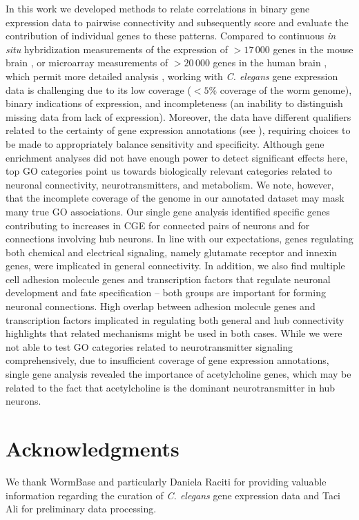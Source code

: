 \documentclass[10pt,letterpaper]{article}
\begin{document}
{In this work we developed methods to relate correlations in binary gene expression data to pairwise connectivity and subsequently score and evaluate the contribution of individual genes to these patterns.
Compared to continuous \emph{in situ} hybridization measurements of the expression of $>17\,000$ genes in the mouse brain \cite{Lein:2007jn}, or microarray measurements of $>20\,000$ genes in the human brain \cite{Hawrylycz:2012ky, Shen:2012ua}, which permit more detailed analysis \cite{Fulcher:2016ck, Ji:2014jw, Fakhry:2015kl, French2011, Vertes2016a, Parkes:2017dn}, working with \emph{C. elegans} gene expression data is challenging due to its low coverage ($<5$\% coverage of the worm genome), binary indications of expression, and incompleteness (an inability to distinguish missing data from lack of expression).
Moreover, the data have different qualifiers related to the certainty of gene expression annotations (see ), requiring choices to be made to appropriately balance sensitivity and specificity.
Although gene enrichment analyses did not have enough power to detect significant effects here, top GO categories point us towards biologically relevant categories related to neuronal connectivity, neurotransmitters, and metabolism.
We note, however, that the incomplete coverage of the genome in our annotated dataset may mask many true GO associations.
Our single gene analysis identified specific genes contributing to increases in CGE for connected pairs of neurons and for connections involving hub neurons.
In line with our expectations, genes regulating both chemical and electrical signaling, namely glutamate receptor and innexin genes, were implicated in general connectivity.
In addition, we also find multiple cell adhesion molecule genes and transcription factors that regulate neuronal development and fate specification -- both groups are important for forming neuronal connections.
High overlap between adhesion molecule genes and transcription factors implicated in regulating both general and hub connectivity highlights that related mechanisms might be used in both cases.
While we were not able to test GO categories related to neurotransmitter signaling comprehensively, due to insufficient coverage of gene expression annotations, single gene analysis revealed the importance of acetylcholine genes, which may be related to the fact that acetylcholine is the dominant neurotransmitter in hub neurons.

\section*{Acknowledgments}
We thank WormBase and particularly Daniela Raciti for providing valuable information regarding the curation of \emph{C. elegans} gene expression data and Taci Ali for preliminary data processing. 

}
\end{document}
